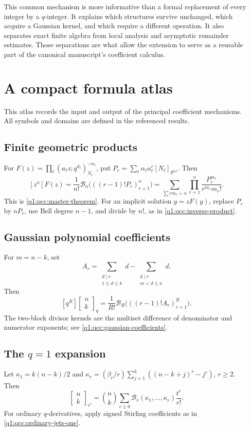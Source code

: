 \documentclass[11pt,a4paper,oneside,openany]{book}
\theoremstyle{definition}
\theoremstyle{remark}
\newcommand{\GB}[3][q]{\begin{bmatrix}#2\\#3\end{bmatrix}_{#1}}
\newcommand{\Y}[1]{\mathcal B_{#1}}
\begin{document}
This common mechanism is more informative than a formal replacement of every
integer by a \(q\)-integer. It explains which structures survive unchanged,
which acquire a Gaussian kernel, and which require a different operation.
It also separates exact finite algebra from local analysis and asymptotic
remainder estimates. Those separations are what allow the extension to serve
as a reusable part of the canonical manuscript's coefficient calculus.
\appendix
\chapter{A compact formula atlas}
\label{q1:qcc:atlas}
This atlas records the input and output of the principal coefficient mechanisms.
All symbols and domains are defined in the referenced results.

\section*{Finite geometric products}
For
\(F(z)=\prod_\ell(a_\ell z;q^{d_\ell})_{N_\ell}^{-\alpha_\ell}\), put
\(P_r=\sum_\ell\alpha_\ell a_\ell^r[N_\ell]_{q^{d_\ell r}}\). Then
\[
 [z^n]F(z)=\frac1{n!}\Y n\bigl(((r-1)!P_r)_{r=1}^{n}\bigr)
 =\sum_{\sum rm_r=n}\prod_{r=1}^{n}\frac{P_r^{m_r}}{r^{m_r}m_r!}.
\]
This is \cref{q1:qcc:master-theorem}. For an implicit solution \(y=zF(y)\),
replace \(P_r\) by \(nP_r\), use Bell degree \(n-1\), and divide by
\(n!\), as in \cref{q1:qcc:inverse-product}.

\section*{Gaussian polynomial coefficients}
For \(m=n-k\), set
\[
 A_r=\sum_{\substack{d\mid r\\1\le d\le k}}d
     -\sum_{\substack{d\mid r\\m<d\le n}}d.
\]
Then
\[
 [q^R]\GB nk=\frac1{R!}
       \Y R\bigl(((r-1)!A_r)_{r=1}^{R}\bigr).
\]
The two-block divisor kernels are the multiset difference of denominator and
numerator exponents; see \cref{q1:qcc:gaussian-coefficients}.

\section*{The \(q=1\) expansion}
Let
\(\kappa_1=k(n-k)/2\) and
\(\kappa_r=(\beta_r/r)\sum_{j=1}^{k}((n-k+j)^r-j^r)\), \(r\ge2\).
Then
\[
 \GB[e^t]nk=\binom nk\sum_{r\ge0}\Y r(\kappa_1,\ldots,\kappa_r)
                                      \frac{t^r}{r!}.
\]
For ordinary \(q\)-derivatives, apply signed Stirling coefficients as in
\eqref{q1:qcc:ordinary-jets-one}.
\end{document}
